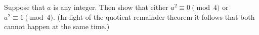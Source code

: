 Suppose that $a$ is any integer. Then show that either $a^2 \equiv 0 \pmod{4}$ or $a^2 \equiv 1 \pmod{4}$. (In light of the quotient remainder theorem it follows that both cannot happen at the same time.)